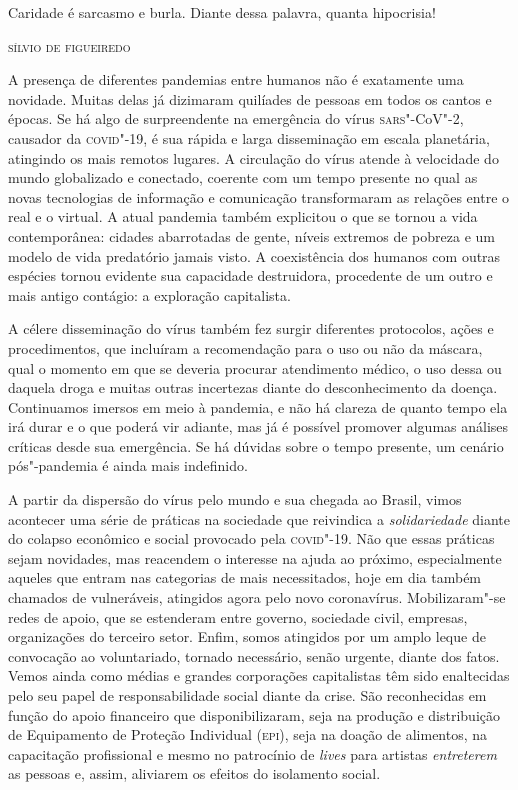 
\epigraph{Caridade é sarcasmo e burla. Diante dessa palavra, quanta
hipocrisia!}{\textsc{sílvio de figueiredo}}

\noindent{}A presença de diferentes pandemias entre humanos não é exatamente uma
novidade. Muitas delas já dizimaram quilíades de pessoas em todos os
cantos e épocas. Se há algo de surpreendente na emergência do vírus
\textsc{sars}"-CoV"-2, causador da \textsc{covid}"-19, é sua rápida e larga disseminação em
escala planetária, atingindo os mais remotos lugares. A circulação do
vírus atende à velocidade do mundo globalizado e conectado, coerente com
um tempo presente no qual as novas tecnologias de informação e
comunicação transformaram as relações entre o real e o virtual. A atual
pandemia também explicitou o que se tornou a vida contemporânea: cidades
abarrotadas de gente, níveis extremos de pobreza e um modelo de vida
predatório jamais visto. A coexistência dos humanos com outras espécies
tornou evidente sua capacidade destruidora, procedente de um outro e
mais antigo contágio: a exploração capitalista.

A célere disseminação do vírus também fez surgir diferentes protocolos,
ações e procedimentos, que incluíram a recomendação para o uso ou não da
máscara, qual o momento em que se deveria procurar atendimento médico, o
uso dessa ou daquela droga e muitas outras incertezas diante do
desconhecimento da doença. Continuamos imersos em meio à pandemia, e não
há clareza de quanto tempo ela irá durar e o que poderá vir adiante, mas
já é possível promover algumas análises críticas desde sua emergência.
Se há dúvidas sobre o tempo presente, um cenário pós"-pandemia é ainda
mais indefinido.

A partir da dispersão do vírus pelo mundo e sua chegada ao Brasil, vimos
acontecer uma série de práticas na sociedade que reivindica a
\emph{solidariedade} diante do colapso econômico e social provocado pela
\textsc{covid}"-19. Não que essas práticas sejam novidades, mas reacendem o
interesse na ajuda ao próximo, especialmente aqueles que entram nas
categorias de mais necessitados, hoje em dia também chamados de
vulneráveis, atingidos agora pelo novo coronavírus. Mobilizaram"-se redes
de apoio, que se estenderam entre governo, sociedade civil, empresas,
organizações do terceiro setor. Enfim, somos atingidos por um amplo
leque de convocação ao voluntariado, tornado necessário, senão urgente,
diante dos fatos. Vemos ainda como médias e grandes corporações
capitalistas têm sido enaltecidas pelo seu papel de responsabilidade
social diante da crise. São reconhecidas em função do apoio financeiro
que disponibilizaram, seja na produção e distribuição de Equipamento de
Proteção Individual (\textsc{epi}), seja na doação de alimentos, na capacitação
profissional e mesmo no patrocínio de \emph{lives} para artistas
\emph{entreterem} as pessoas e, assim, aliviarem os efeitos do
isolamento social.

